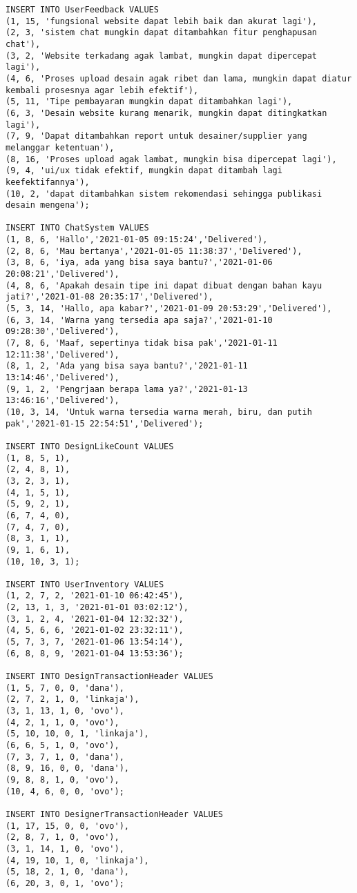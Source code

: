 \begin{lstlisting}
INSERT INTO UserFeedback VALUES
(1, 15, 'fungsional website dapat lebih baik dan akurat lagi'),
(2, 3, 'sistem chat mungkin dapat ditambahkan fitur penghapusan chat'),
(3, 2, 'Website terkadang agak lambat, mungkin dapat dipercepat lagi'),
(4, 6, 'Proses upload desain agak ribet dan lama, mungkin dapat diatur kembali prosesnya agar lebih efektif'),
(5, 11, 'Tipe pembayaran mungkin dapat ditambahkan lagi'),
(6, 3, 'Desain website kurang menarik, mungkin dapat ditingkatkan lagi'),
(7, 9, 'Dapat ditambahkan report untuk desainer/supplier yang melanggar ketentuan'),
(8, 16, 'Proses upload agak lambat, mungkin bisa dipercepat lagi'),
(9, 4, 'ui/ux tidak efektif, mungkin dapat ditambah lagi keefektifannya'),
(10, 2, 'dapat ditambahkan sistem rekomendasi sehingga publikasi desain mengena');

INSERT INTO ChatSystem VALUES
(1, 8, 6, 'Hallo','2021-01-05 09:15:24','Delivered'),
(2, 8, 6, 'Mau bertanya','2021-01-05 11:38:37','Delivered'),
(3, 8, 6, 'iya, ada yang bisa saya bantu?','2021-01-06 20:08:21','Delivered'),
(4, 8, 6, 'Apakah desain tipe ini dapat dibuat dengan bahan kayu jati?','2021-01-08 20:35:17','Delivered'),
(5, 3, 14, 'Hallo, apa kabar?','2021-01-09 20:53:29','Delivered'),
(6, 3, 14, 'Warna yang tersedia apa saja?','2021-01-10 09:28:30','Delivered'),
(7, 8, 6, 'Maaf, sepertinya tidak bisa pak','2021-01-11 12:11:38','Delivered'),
(8, 1, 2, 'Ada yang bisa saya bantu?','2021-01-11 13:14:46','Delivered'),
(9, 1, 2, 'Pengrjaan berapa lama ya?','2021-01-13 13:46:16','Delivered'),
(10, 3, 14, 'Untuk warna tersedia warna merah, biru, dan putih pak','2021-01-15 22:54:51','Delivered');

INSERT INTO DesignLikeCount VALUES
(1, 8, 5, 1),
(2, 4, 8, 1),
(3, 2, 3, 1),
(4, 1, 5, 1),
(5, 9, 2, 1),
(6, 7, 4, 0),
(7, 4, 7, 0),
(8, 3, 1, 1),
(9, 1, 6, 1),
(10, 10, 3, 1);

INSERT INTO UserInventory VALUES
(1, 2, 7, 2, '2021-01-10 06:42:45'),
(2, 13, 1, 3, '2021-01-01 03:02:12'),
(3, 1, 2, 4, '2021-01-04 12:32:32'),
(4, 5, 6, 6, '2021-01-02 23:32:11'),
(5, 7, 3, 7, '2021-01-06 13:54:14'),
(6, 8, 8, 9, '2021-01-04 13:53:36');

INSERT INTO DesignTransactionHeader VALUES
(1, 5, 7, 0, 0, 'dana'),
(2, 7, 2, 1, 0, 'linkaja'),
(3, 1, 13, 1, 0, 'ovo'),
(4, 2, 1, 1, 0, 'ovo'),
(5, 10, 10, 0, 1, 'linkaja'),
(6, 6, 5, 1, 0, 'ovo'),
(7, 3, 7, 1, 0, 'dana'),
(8, 9, 16, 0, 0, 'dana'),
(9, 8, 8, 1, 0, 'ovo'),
(10, 4, 6, 0, 0, 'ovo');

INSERT INTO DesignerTransactionHeader VALUES 
(1, 17, 15, 0, 0, 'ovo'),
(2, 8, 7, 1, 0, 'ovo'),
(3, 1, 14, 1, 0, 'ovo'),
(4, 19, 10, 1, 0, 'linkaja'),
(5, 18, 2, 1, 0, 'dana'),
(6, 20, 3, 0, 1, 'ovo');


\end{lstlisting}
